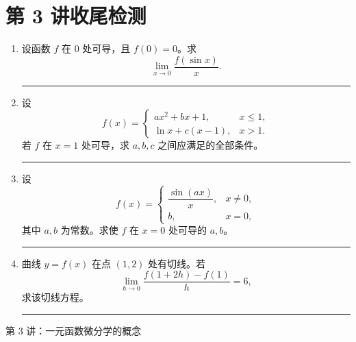 \documentclass[11pt,a4paper,fontset=fandol]{ctexart}
\newcommand{\workarea}[1]{\par\vspace{0.2em}\noindent\rule{\linewidth}{0.35pt}\vspace{#1}\par}
\begin{document}
\section*{第 3 讲收尾检测}
\begin{enumerate}[label=\textbf{\arabic*.},itemsep=0.9em]
\item 设函数 $f$ 在 $0$ 处可导，且 $f(0)=0$。求
\[
\lim_{x\to0}\frac{f(\sin x)}{x}.
\]
\workarea{5.0cm}

\item 设
\[
f(x)=\begin{cases}
ax^2+bx+1,&x\le 1,\\
\ln x+c(x-1),&x>1.
\end{cases}
\]
若 $f$ 在 $x=1$ 处可导，求 $a,b,c$ 之间应满足的全部条件。
\workarea{6.0cm}

\item 设
\[
f(x)=\begin{cases}
\dfrac{\sin(ax)}{x},&x\ne0,\\
b,&x=0,
\end{cases}
\]
其中 $a,b$ 为常数。求使 $f$ 在 $x=0$ 处可导的 $a,b$。
\workarea{5.5cm}

\item 曲线 $y=f(x)$ 在点 $(1,2)$ 处有切线。若
\[
\lim_{h\to0}\frac{f(1+2h)-f(1)}{h}=6,
\]
求该切线方程。
\workarea{5.0cm}
\end{enumerate}
\vfill
\begin{center}\small 第 3 讲：一元函数微分学的概念\end{center}
\end{document}
